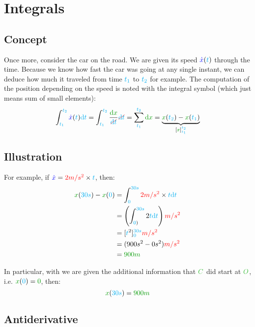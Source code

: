 \section{Integrals}


\subsection{Concept}

Once more, consider the car on the road. We are given its speed
$\textcolor{blue}{\dot x}(\textcolor{cyan}{t})$ through the time. Because we know how fast the
car was going at any single instant, we can deduce how much it traveled
from time $\textcolor{cyan}{t_1}$ to $\textcolor{cyan}{t_2}$ for example. The computation
of the position depending on the speed is
noted with the integral symbol (which just means sum of small elements):
\[
\int_{\delay{t_1}}^{\delay{t_2}} \speed{\dot x}(\delay{t}) \delay{\dt}
= \int_{\delay{t_1}}^{\delay{t_2}} \frac {\dist{\d x}} {\strike[red]{\delay{\dt}}} \strike[red]{\delay{\dt}}
= \sum_{\delay{t_1}}^{\delay{t_2}} \dist{\d x}
= \underbrace{
	\dist{x}(\delay{t_2}) - \dist{x}(\delay{t_1})
}_{[\dist{x}]_{\delay{t_1}}^{\delay{t_2}}}
\]


\subsection{Illustration}

For example, if $\textcolor{blue}{\dot x} = \textcolor{red}{2m/s^2} \times \textcolor{cyan}{t}$, then:
\begin{align*}
\dist{x}(\delay{30s}) - \dist{x}(\delay{0})
&= \int_{\delay{0}}^{\delay{30s}} \accel{2m/s^2} \times \delay{t} \delay{\dt} \\
&= \left(\int_{\delay{0})}^{\delay{30s}} 2 \delay{t} \delay{\dt}\right) \accel{m/s^2} \\
&= [\delay{t}^2]_{\delay{0}}^{\delay{30s}} \accel{m/s^2} \\
&= (900s^2 - 0s^2) \accel{m/s^2} \\
&= \dist{900m}
\end{align*}

In particular, with we are given the additional information that $\posit{C}$
did start at $\posit{O}$, i.e.  $\dist{x}(\delay{0}) = \dist{0}$, then:
\[
\dist{x}(\delay{30s}) = \dist{900m}
\]


\subsection{Antiderivative}

